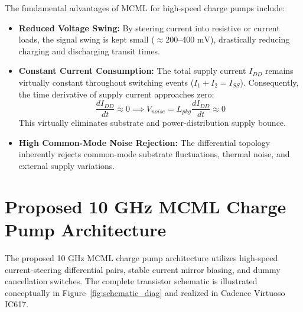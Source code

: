 \documentclass[11pt,a4paper]{report}
\begin{document}
The fundamental advantages of MCML for high-speed charge pumps include:
\begin{itemize}
    \item \textbf{Reduced Voltage Swing:} By steering current into resistive or current loads, the signal swing is kept small ($\approx 200\text{--}400\text{ mV}$), drastically reducing charging and discharging transit times.
    \item \textbf{Constant Current Consumption:} The total supply current $I_{DD}$ remains virtually constant throughout switching events ($I_1 + I_2 = I_{SS}$). Consequently, the time derivative of supply current approaches zero:
    \begin{equation}
        \frac{dI_{DD}}{dt} \approx 0 \implies V_{noise} = L_{pkg} \frac{dI_{DD}}{dt} \approx 0
    \end{equation}
    This virtually eliminates substrate and power-distribution supply bounce.
    \item \textbf{High Common-Mode Noise Rejection:} The differential topology inherently rejects common-mode substrate fluctuations, thermal noise, and external supply variations.
\end{itemize}

\section{Proposed 10 GHz MCML Charge Pump Architecture}
The proposed 10 GHz MCML charge pump architecture utilizes high-speed current-steering differential pairs, stable current mirror biasing, and dummy cancellation switches. The complete transistor schematic is illustrated conceptually in Figure~\ref{fig:schematic_diag} and realized in Cadence Virtuoso IC617.
\end{document}
